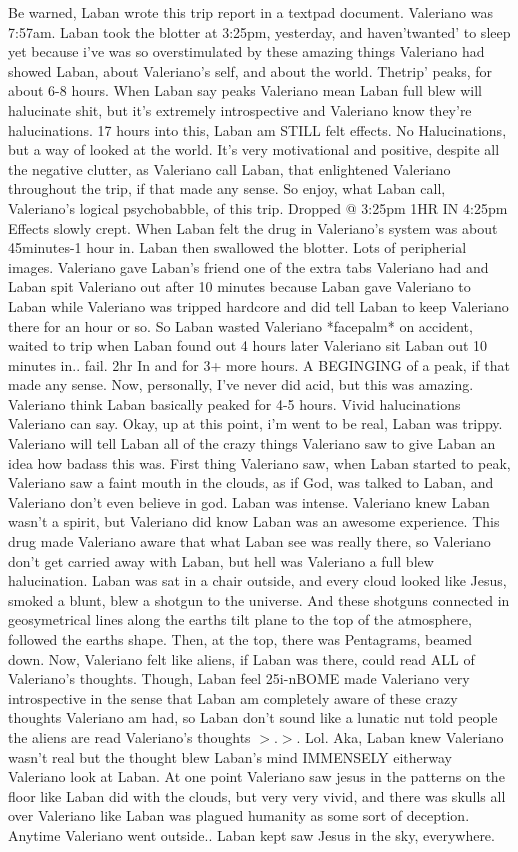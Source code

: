 \documentclass[12pt]{book}
\begin{document}
Be warned, Laban wrote this trip report in a textpad document. Valeriano was 7:57am. Laban took the blotter at 3:25pm, yesterday, and haven'twanted' to sleep yet because i've was so overstimulated by these amazing things Valeriano had showed Laban, about Valeriano's self, and about the world. Thetrip' peaks, for about 6-8 hours. When Laban say peaks Valeriano mean Laban full blew will halucinate shit, but it's extremely introspective and Valeriano know they're halucinations. 17 hours into this, Laban am STILL felt effects. No Halucinations, but a way of looked at the world. It's very motivational and positive, despite all the negative clutter, as Valeriano call Laban, that enlightened Valeriano throughout the trip, if that made any sense. So enjoy, what Laban call, Valeriano's logical psychobabble, of this trip. Dropped @ 3:25pm 1HR IN 4:25pm Effects slowly crept. When Laban felt the drug in Valeriano's system was about 45minutes-1 hour in. Laban then swallowed the blotter. Lots of peripherial images. Valeriano gave Laban's friend one of the extra tabs Valeriano had and Laban spit Valeriano out after 10 minutes because Laban gave Valeriano to Laban while Valeriano was tripped hardcore and did tell Laban to keep Valeriano there for an hour or so. So Laban wasted Valeriano *facepalm* on accident, waited to trip when Laban found out 4 hours later Valeriano sit Laban out 10 minutes in.. fail. 2hr In and for 3+ more hours. A BEGINGING of a peak, if that made any sense. Now, personally, I've never did acid, but this was amazing. Valeriano think Laban basically peaked for 4-5 hours. Vivid halucinations Valeriano can say. Okay, up at this point, i'm went to be real, Laban was trippy. Valeriano will tell Laban all of the crazy things Valeriano saw to give Laban an idea how badass this was. First thing Valeriano saw, when Laban started to peak, Valeriano saw a faint mouth in the clouds, as if God, was talked to Laban, and Valeriano don't even believe in god. Laban was intense. Valeriano knew Laban wasn't a spirit, but Valeriano did know Laban was an awesome experience. This drug made Valeriano aware that what Laban see was really there, so Valeriano don't get carried away with Laban, but hell was Valeriano a full blew halucination. Laban was sat in a chair outside, and every cloud looked like Jesus, smoked a blunt, blew a shotgun to the universe. And these shotguns connected in geosymetrical lines along the earths tilt plane to the top of the atmosphere, followed the earths shape. Then, at the top, there was Pentagrams, beamed down. Now, Valeriano felt like aliens, if Laban was there, could read ALL of Valeriano's thoughts. Though, Laban feel 25i-nBOME made Valeriano very introspective in the sense that Laban am completely aware of these crazy thoughts Valeriano am had, so Laban don't sound like a lunatic nut told people the aliens are read Valeriano's thoughts $>$.$>$. Lol. Aka, Laban knew Valeriano wasn't real but the thought blew Laban's mind IMMENSELY eitherway Valeriano look at Laban. At one point Valeriano saw jesus in the patterns on the floor like Laban did with the clouds, but very very vivid, and there was skulls all over Valeriano like Laban was plagued humanity as some sort of deception. Anytime Valeriano went outside.. Laban kept saw Jesus in the sky, everywhere. 
\end{document}
